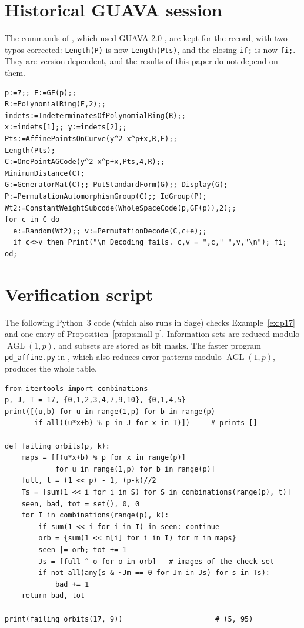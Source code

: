 \documentclass[12pt,letterpaper]{article}
\theoremstyle{definition}
\theoremstyle{remark}
\numberwithin{equation}{section}
\newcommand{\AGL}{\operatorname{AGL}}
\begin{document}
\section{Historical GUAVA session}\label{app:guava}
The commands of \cite{Jo05}, which used GUAVA 2.0 \cite{GUAVA}, are kept
for the record, with two typos corrected: \texttt{Length(P)} is now
\texttt{Length(Pts)}, and the closing \texttt{if;} is now \texttt{fi;}.
They are version dependent, and the results of this paper do not depend
on them.
\begin{verbatim}
p:=7;; F:=GF(p);;
R:=PolynomialRing(F,2);;
indets:=IndeterminatesOfPolynomialRing(R);;
x:=indets[1];; y:=indets[2];;
Pts:=AffinePointsOnCurve(y^2-x^p+x,R,F);;
Length(Pts);
C:=OnePointAGCode(y^2-x^p+x,Pts,4,R);;
MinimumDistance(C);
G:=GeneratorMat(C);; PutStandardForm(G);; Display(G);
P:=PermutationAutomorphismGroup(C);; IdGroup(P);
Wt2:=ConstantWeightSubcode(WholeSpaceCode(p,GF(p)),2);;
for c in C do
  e:=Random(Wt2);; v:=PermutationDecode(C,c+e);;
  if c<>v then Print("\n Decoding fails. c,v = ",c," ",v,"\n"); fi;
od;
\end{verbatim}

\section{Verification script}\label{app:script}
The following Python~3 code (which also runs in Sage) checks
Example~\ref{ex:p17} and one entry of Proposition~\ref{prop:small-p}.
Information sets are reduced modulo $\AGL(1,p)$, and subsets are stored
as bit masks.  The faster program \texttt{pd\_affine.py} in
\cite{Jo26}, which also reduces error patterns modulo $\AGL(1,p)$,
produces the whole table.
\begin{verbatim}
from itertools import combinations
p, J, T = 17, {0,1,2,3,4,7,9,10}, {0,1,4,5}
print([(u,b) for u in range(1,p) for b in range(p)
       if all((u*x+b) % p in J for x in T)])     # prints []

def failing_orbits(p, k):
    maps = [[(u*x+b) % p for x in range(p)]
            for u in range(1,p) for b in range(p)]
    full, t = (1 << p) - 1, (p-k)//2
    Ts = [sum(1 << i for i in S) for S in combinations(range(p), t)]
    seen, bad, tot = set(), 0, 0
    for I in combinations(range(p), k):
        if sum(1 << i for i in I) in seen: continue
        orb = {sum(1 << m[i] for i in I) for m in maps}
        seen |= orb; tot += 1
        Js = [full ^ o for o in orb]   # images of the check set
        if not all(any(s & ~Jm == 0 for Jm in Js) for s in Ts):
            bad += 1
    return bad, tot

print(failing_orbits(17, 9))                      # (5, 95)
\end{verbatim}
\end{document}
